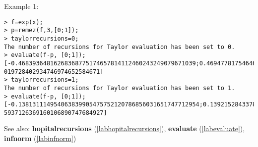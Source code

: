 \noindent Example 1: 
\begin{center}\begin{minipage}{15cm}\begin{Verbatim}[frame=single,commandchars=\\\|\~]
> f=exp(x);
> p=remez(f,3,[0;1]);
> taylorrecursions=0;
The number of recursions for Taylor evaluation has been set to 0.
> evaluate(f-p, [0;1]);
[-0.46839364816268368775174657814112460243249079671039;0.46947781754646820647293
019728402934746974652584671]
> taylorrecursions=1;
The number of recursions for Taylor evaluation has been set to 1.
> evaluate(f-p, [0;1]);
[-0.138131114954063839905475752120786856031651747712954;0.1392152843378483586266
5937126369160106890747684927]
\end{Verbatim}
\end{minipage}\end{center}
See also: \textbf{hopitalrecursions} (\ref{labhopitalrecursions}), \textbf{evaluate} (\ref{labevaluate}), \textbf{infnorm} (\ref{labinfnorm})
